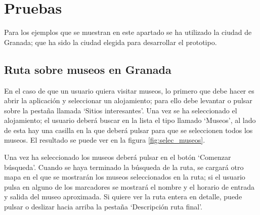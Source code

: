 \section{Pruebas}
Para los ejemplos que se muestran en este apartado se ha utilizado la ciudad de Granada; que ha sido la ciudad elegida para desarrollar el prototipo.

\subsection[Caso 1]{Ruta sobre museos en Granada}
En el caso de que un usuario quiera visitar museos, lo primero que debe hacer es abrir la aplicación y seleccionar un alojamiento; para ello debe levantar o pulsar sobre la pestaña llamada \enquote*{Sitios interesantes}. Una vez se ha seleccionado el alojamiento; el usuario deberá buscar en la lista el tipo llamado \enquote*{Museos}, al lado de esta hay una casilla en la que deberá pulsar para que se seleccionen todos los museos. El resultado se puede ver en la figura \ref{fig:selec_museos}.\newline

Una vez ha seleccionado los museos deberá pulsar en el botón \enquote*{Comenzar búsqueda}. Cuando se haya terminado la búsqueda de la ruta, se cargará otro mapa en el que se mostrarán los museos seleccionados en la ruta; si el usuario pulsa en alguno de los marcadores se mostrará el nombre y el horario de entrada y salida del museo aproximada. Si quiere ver la ruta entera en detalle, puede pulsar o deslizar hacia arriba la pestaña \enquote*{Descripción ruta final}.\newline

